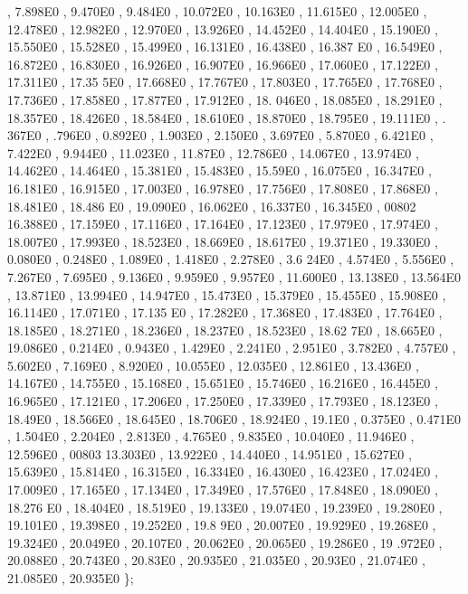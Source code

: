 \begin{DoxyCode}
       , 7.898E0 , 9.470E0 , 9.484E0 , 10.072E0 , 10.163E0 , 11.615E0 , 12.005E0 , 12.478E0 , 12.982E0 , 12.970E0 
      , 13.926E0 , 14.452E0 , 14.404E0 , 15.190E0 , 15.550E0 , 15.528E0 , 15.499E0 , 16.131E0 , 16.438E0 , 16.387
      E0 , 16.549E0 , 16.872E0 , 16.830E0 , 16.926E0 , 16.907E0 , 16.966E0 , 17.060E0 , 17.122E0 , 17.311E0 , 17.35
      5E0 , 17.668E0 , 17.767E0 , 17.803E0 , 17.765E0 , 17.768E0 , 17.736E0 , 17.858E0 , 17.877E0 , 17.912E0 , 18.
      046E0 , 18.085E0 , 18.291E0 , 18.357E0 , 18.426E0 , 18.584E0 , 18.610E0 , 18.870E0 , 18.795E0 , 19.111E0 , .
      367E0 , .796E0 , 0.892E0 , 1.903E0 , 2.150E0 , 3.697E0 , 5.870E0 , 6.421E0 , 7.422E0 , 9.944E0 , 11.023E0 , 
      11.87E0  , 12.786E0 , 14.067E0 , 13.974E0 , 14.462E0 , 14.464E0 , 15.381E0 , 15.483E0 , 15.59E0  , 16.075E0 
      , 16.347E0 , 16.181E0 , 16.915E0 , 17.003E0 , 16.978E0 , 17.756E0 , 17.808E0 , 17.868E0 , 18.481E0 , 18.486
      E0 , 19.090E0 , 16.062E0 , 16.337E0 , 16.345E0 ,
00802         16.388E0 , 17.159E0 , 17.116E0 , 17.164E0 , 17.123E0 , 17.979E0 , 17.974E0 , 18.007E0 , 17.993E0 , 
      18.523E0 , 18.669E0 , 18.617E0 , 19.371E0 , 19.330E0 , 0.080E0 , 0.248E0 , 1.089E0 , 1.418E0 , 2.278E0 , 3.6
      24E0 , 4.574E0 , 5.556E0 , 7.267E0 , 7.695E0 , 9.136E0 , 9.959E0 , 9.957E0 , 11.600E0 , 13.138E0 , 13.564E0 
      , 13.871E0 , 13.994E0 , 14.947E0 , 15.473E0 , 15.379E0 , 15.455E0 , 15.908E0 , 16.114E0 , 17.071E0 , 17.135
      E0 , 17.282E0 , 17.368E0 , 17.483E0 , 17.764E0 , 18.185E0 , 18.271E0 , 18.236E0 , 18.237E0 , 18.523E0 , 18.62
      7E0 , 18.665E0 , 19.086E0 , 0.214E0 , 0.943E0 , 1.429E0 , 2.241E0 , 2.951E0 , 3.782E0 , 4.757E0 , 5.602E0 , 
      7.169E0 , 8.920E0 , 10.055E0 , 12.035E0 , 12.861E0 , 13.436E0 , 14.167E0 , 14.755E0 , 15.168E0 , 15.651E0 , 
      15.746E0 , 16.216E0 , 16.445E0 , 16.965E0 , 17.121E0 , 17.206E0 , 17.250E0 , 17.339E0 , 17.793E0 , 18.123E0 
      , 18.49E0  , 18.566E0 , 18.645E0 , 18.706E0 , 18.924E0 , 19.1E0   , 0.375E0 , 0.471E0 , 1.504E0 , 2.204E0 , 
      2.813E0 , 4.765E0 , 9.835E0 , 10.040E0 , 11.946E0 , 12.596E0 , 
00803 13.303E0 , 13.922E0 , 14.440E0 , 14.951E0 , 15.627E0 , 15.639E0 , 15.814E0 , 16.315E0 , 16.334E0 , 16.430E0
       , 16.423E0 , 17.024E0 , 17.009E0 , 17.165E0 , 17.134E0 , 17.349E0 , 17.576E0 , 17.848E0 , 18.090E0 , 18.276
      E0 , 18.404E0 , 18.519E0 , 19.133E0 , 19.074E0 , 19.239E0 , 19.280E0 , 19.101E0 , 19.398E0 , 19.252E0 , 19.8
      9E0  , 20.007E0 , 19.929E0 , 19.268E0 , 19.324E0 , 20.049E0 , 20.107E0 , 20.062E0 , 20.065E0 , 19.286E0 , 19
      .972E0 , 20.088E0 , 20.743E0 , 20.83E0  , 20.935E0 , 21.035E0 , 20.93E0  , 21.074E0 , 21.085E0 , 20.935E0 \};

\end{DoxyCode}
